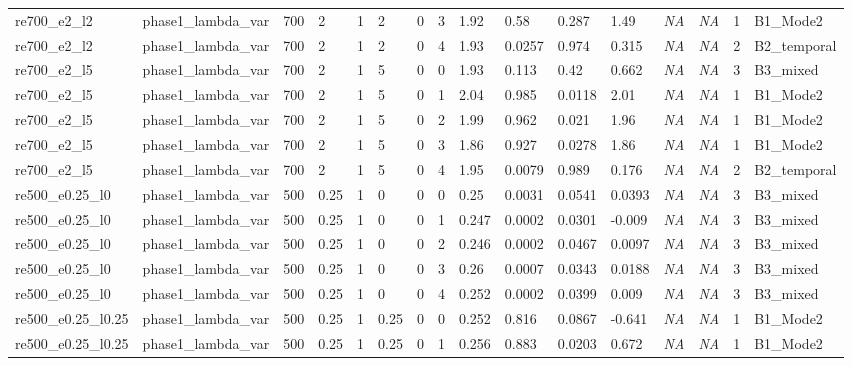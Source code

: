 \documentclass[11pt,a4paper]{article}
\begin{document}
\begin{landscape}
\begin{longtable}{*{16}{l}}
    re700\_e2\_l2 & phase1\_lambda\_var & 700 & 2 & 1 & 2 & 0 & 3 & 1.92 & 0.58 & 0.287 & 1.49 & \textit{NA} & \textit{NA} & 1 & B1\_Mode2 \\
    re700\_e2\_l2 & phase1\_lambda\_var & 700 & 2 & 1 & 2 & 0 & 4 & 1.93 & 0.0257 & 0.974 & 0.315 & \textit{NA} & \textit{NA} & 2 & B2\_temporal \\
    re700\_e2\_l5 & phase1\_lambda\_var & 700 & 2 & 1 & 5 & 0 & 0 & 1.93 & 0.113 & 0.42 & 0.662 & \textit{NA} & \textit{NA} & 3 & B3\_mixed \\
    re700\_e2\_l5 & phase1\_lambda\_var & 700 & 2 & 1 & 5 & 0 & 1 & 2.04 & 0.985 & 0.0118 & 2.01 & \textit{NA} & \textit{NA} & 1 & B1\_Mode2 \\
    re700\_e2\_l5 & phase1\_lambda\_var & 700 & 2 & 1 & 5 & 0 & 2 & 1.99 & 0.962 & 0.021 & 1.96 & \textit{NA} & \textit{NA} & 1 & B1\_Mode2 \\
    re700\_e2\_l5 & phase1\_lambda\_var & 700 & 2 & 1 & 5 & 0 & 3 & 1.86 & 0.927 & 0.0278 & 1.86 & \textit{NA} & \textit{NA} & 1 & B1\_Mode2 \\
    re700\_e2\_l5 & phase1\_lambda\_var & 700 & 2 & 1 & 5 & 0 & 4 & 1.95 & 0.0079 & 0.989 & 0.176 & \textit{NA} & \textit{NA} & 2 & B2\_temporal \\
    re500\_e0.25\_l0 & phase1\_lambda\_var & 500 & 0.25 & 1 & 0 & 0 & 0 & 0.25 & 0.0031 & 0.0541 & 0.0393 & \textit{NA} & \textit{NA} & 3 & B3\_mixed \\
    re500\_e0.25\_l0 & phase1\_lambda\_var & 500 & 0.25 & 1 & 0 & 0 & 1 & 0.247 & 0.0002 & 0.0301 & -0.009 & \textit{NA} & \textit{NA} & 3 & B3\_mixed \\
    re500\_e0.25\_l0 & phase1\_lambda\_var & 500 & 0.25 & 1 & 0 & 0 & 2 & 0.246 & 0.0002 & 0.0467 & 0.0097 & \textit{NA} & \textit{NA} & 3 & B3\_mixed \\
    re500\_e0.25\_l0 & phase1\_lambda\_var & 500 & 0.25 & 1 & 0 & 0 & 3 & 0.26 & 0.0007 & 0.0343 & 0.0188 & \textit{NA} & \textit{NA} & 3 & B3\_mixed \\
    re500\_e0.25\_l0 & phase1\_lambda\_var & 500 & 0.25 & 1 & 0 & 0 & 4 & 0.252 & 0.0002 & 0.0399 & 0.009 & \textit{NA} & \textit{NA} & 3 & B3\_mixed \\
    re500\_e0.25\_l0.25 & phase1\_lambda\_var & 500 & 0.25 & 1 & 0.25 & 0 & 0 & 0.252 & 0.816 & 0.0867 & -0.641 & \textit{NA} & \textit{NA} & 1 & B1\_Mode2 \\
    re500\_e0.25\_l0.25 & phase1\_lambda\_var & 500 & 0.25 & 1 & 0.25 & 0 & 1 & 0.256 & 0.883 & 0.0203 & 0.672 & \textit{NA} & \textit{NA} & 1 & B1\_Mode2 \\

\end{longtable}
\end{landscape}
\end{document}
